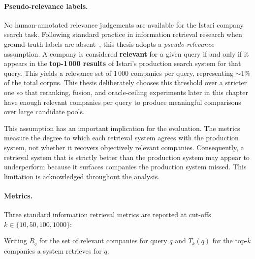 \documentclass[a4paper,oneside,bibliography=totoc]{scrbook}
\begin{document}
\paragraph{Pseudo-relevance labels.} No human-annotated relevance judgements are available for the Istari company search task. Following standard practice in information retrieval research when ground-truth labels are absent~\citep{voorhees2002philosophy}, this thesis adopts a \textit{pseudo-relevance} assumption. A company is considered \textbf{relevant} for a given query if and only if it appears in the \textbf{top-1\,000 results} of Istari's production search system for that query. This yields a relevance set of 1\,000 companies per query, representing ${\sim}1\%$ of the total corpus. This thesis deliberately chooses this threshold over a stricter one so that reranking, fusion, and oracle-ceiling experiments later in this chapter have enough relevant companies per query to produce meaningful comparisons over large candidate pools.

This assumption has an important implication for the evaluation. The metrics measure the degree to which each retrieval system agrees with the production system, not whether it recovers objectively relevant companies. Consequently, a retrieval system that is strictly better than the production system may appear to underperform because it surfaces companies the production system missed. This limitation is acknowledged throughout the analysis.

\paragraph{Metrics.} Three standard information retrieval metrics are reported at cut-offs $k \in \{10, 50, 100, 1000\}$:

Writing $R_q$ for the set of relevant companies for query $q$ and $T_k(q)$ for the top-$k$ companies a system retrieves for $q$:
\end{document}

